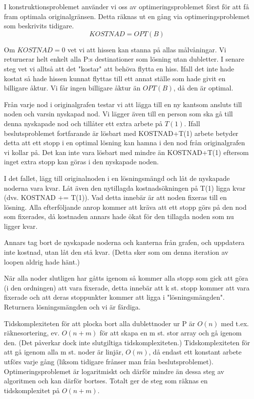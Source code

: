 \documentclass[a4paper,10pt,twoside]{article}
\begin{document}
I konstruktionsproblemet använder vi oss av optimeringsproblemet först för att få fram optimala originalgränsen. Detta räknas ut en gång via optimeringsproblemet som beskrivits tidigare. $$KOSTNAD = OPT(B)$$

Om $KOSTNAD = 0$ vet vi att hissen kan stanna på allas målvåningar. Vi returnerar helt enkelt alla P:s destinationer som lösning utan dubletter. I senare steg vet vi alltså att det "kostar" att behöva flytta en hiss. Ifall det inte hade kostat så hade hissen kunnat flyttas till ett annat ställe som hade givit en billigare åktur. Vi får ingen billigare åktur än $OPT(B)$, då den är optimal.

Från varje nod i originalgrafen testar vi att lägga till en ny kantsom ansluts till noden och varsin nyskapad nod. Vi lägger även till en person som ska gå till denna nyskapade nod och tillåter ett extra arbete på $T(1)$. Ifall beslutsproblemet fortfarande är lösbart med KOSTNAD+T(1) arbete betyder detta att ett stopp i en optimal lösning kan hamna i den nod från originalgrafen vi kollar på. Det kan inte vara lösbart med mindre än KOSTNAD+T(1) eftersom inget extra stopp kan göras i den nyskapade noden.

I det fallet, lägg till originalnoden i en lösningsmängd och låt de nyskapade noderna vara kvar. Låt även den nytillagda kostnadsökningen på T(1) ligga kvar (dvs. KOSTNAD += T(1)). Vad detta innebär är att noden fixeras till en lösning. Alla efterföljande anrop kommer att kräva att ett stopp görs på den nod som fixerades, då kostnaden annars hade ökat för den tillagda noden som nu ligger kvar.

Annars tag bort de nyskapade noderna och kanterna från grafen, och uppdatera inte kostnad, utan låt den stå kvar. (Detta sker som om denna iteration av loopen aldrig hade hänt.)

När alla noder slutligen har gåtts igenom så kommer alla stopp som gick att göra (i den ordningen) att vara fixerade, detta innebär att k st. stopp kommer att vara fixerade och att deras stoppunkter kommer att ligga i "lösningsmängden". Returnera lösningsmängden och vi är färdiga.

Tidskomplexiteten för att plocka bort alla dublettnoder ur P är $O(n)$ med t.ex. räknesortering, ev. $O(n+m)$ för att skapa en m st. stor array och gå igenom den. (Det påverkar dock inte slutgiltiga tidskomplexiteten.) Tidskomplexiteten för att gå igenom alla m st. noder är linjär, $O(m)$, då endast ett konstant arbete utförs varje gång (liksom tidigare frånser man från beslutsproblemet). Optimeringsproblemet är logaritmiskt och därför mindre än dessa steg av algoritmen och kan därför bortses. Totalt ger de steg som räknas en tidskomplexitet på $O(n+m)$.
\end{document}
